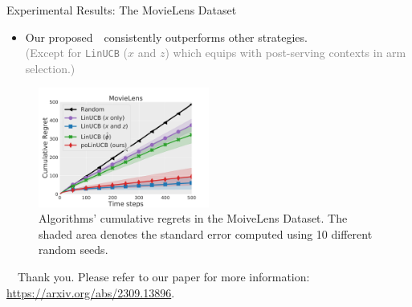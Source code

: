\documentclass[10pt, xcolor={dvipsnames,x11names},compress]{beamer}
\begin{document}
\begin{frame}{Experimental Results: The MovieLens Dataset~}

\begin{itemize}
    \item  Our proposed~\polinucb~consistently outperforms other strategies.\\\textcolor{gray}{{\footnotesize (Except for \texttt{LinUCB} ($x$ and $z$) which equips with post-serving contexts in arm selection.)}}
\end{itemize}

\begin{figure}[h]
    \centering
    \includegraphics[width=0.5\textwidth]{figs/movielens.pdf}
    \vspace{0.2cm}
    \caption{{\small Algorithms' cumulative regrets in the MoiveLens Dataset. The shaded area denotes the standard error computed using 10 different random seeds.}}
    \label{fig:movielens-experiments}
\end{figure}

\end{frame}

\begin{frame}
 \begin{center}
		{\Huge \qquad \ \ Thank you.}
		\bigskip\bigskip %
  \newline
        \bigskip Please refer to our paper for more information:\\
        \href{https://arxiv.org/abs/2309.13896}{https://arxiv.org/abs/2309.13896}.
	\end{center}
\end{frame}
\end{document}
